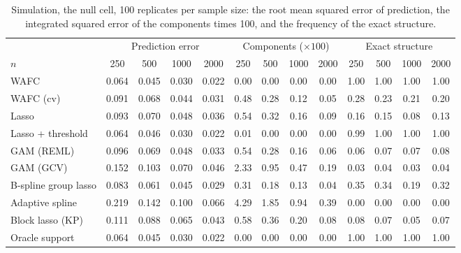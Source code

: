\begin{table}[tp]
\color{colR1}
\caption{Simulation, the null cell, 100 replicates per sample size: the root mean squared error of prediction, the integrated squared error of the components times 100, and the frequency of the exact structure.}
\label{tab:sim-sizes-null}
\centering
\footnotesize
\setlength{\tabcolsep}{3pt}
\begin{tabular}{l cccc cccc cccc}
\hline
 & \multicolumn{4}{c}{Prediction error} & \multicolumn{4}{c}{Components ($\times 100$)} & \multicolumn{4}{c}{Exact structure} \\
$n$ & 250 & 500 & 1000 & 2000 & 250 & 500 & 1000 & 2000 & 250 & 500 & 1000 & 2000 \\
\hline
WAFC & 0.064 & 0.045 & 0.030 & 0.022 & 0.00 & 0.00 & 0.00 & 0.00 & 1.00 & 1.00 & 1.00 & 1.00 \\
WAFC (cv) & 0.091 & 0.068 & 0.044 & 0.031 & 0.48 & 0.28 & 0.12 & 0.05 & 0.28 & 0.23 & 0.21 & 0.20 \\
Lasso & 0.093 & 0.070 & 0.048 & 0.036 & 0.54 & 0.32 & 0.16 & 0.09 & 0.16 & 0.15 & 0.08 & 0.13 \\
Lasso + threshold & 0.064 & 0.046 & 0.030 & 0.022 & 0.01 & 0.00 & 0.00 & 0.00 & 0.99 & 1.00 & 1.00 & 1.00 \\
GAM (REML) & 0.096 & 0.069 & 0.048 & 0.033 & 0.54 & 0.28 & 0.16 & 0.06 & 0.06 & 0.07 & 0.07 & 0.08 \\
GAM (GCV) & 0.152 & 0.103 & 0.070 & 0.046 & 2.33 & 0.95 & 0.47 & 0.19 & 0.03 & 0.04 & 0.03 & 0.04 \\
B-spline group lasso & 0.083 & 0.061 & 0.045 & 0.029 & 0.31 & 0.18 & 0.13 & 0.04 & 0.35 & 0.34 & 0.19 & 0.32 \\
Adaptive spline & 0.219 & 0.142 & 0.100 & 0.066 & 4.29 & 1.85 & 0.94 & 0.39 & 0.00 & 0.00 & 0.00 & 0.00 \\
Block lasso (KP) & 0.111 & 0.088 & 0.065 & 0.043 & 0.58 & 0.36 & 0.20 & 0.08 & 0.08 & 0.07 & 0.05 & 0.07 \\
Oracle support & 0.064 & 0.045 & 0.030 & 0.022 & 0.00 & 0.00 & 0.00 & 0.00 & 1.00 & 1.00 & 1.00 & 1.00 \\
\hline
\end{tabular}
\end{table}

